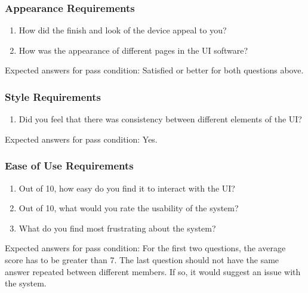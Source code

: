 \documentclass[12pt, titlepage]{article}
\begin{document}
\subsubsection{Appearance Requirements}

\begin{enumerate}
\item{How did the finish and look of the device appeal to you?\\}
\item{How was the appearance of different pages in the UI software?\\}

\end{enumerate}

\noindent Expected answers for pass condition: Satisfied or better for both questions above.


\subsubsection{Style Requirements}

\begin{enumerate}
\item{Did you feel that there was consistency between different elements of the UI?\\}

\end{enumerate}

\noindent Expected answers for pass condition: Yes.


\subsubsection{Ease of Use Requirements}

\begin{enumerate}
\item{Out of 10, how easy do you find it to interact with the UI?\\}
\item{Out of 10, what would you rate the usability of the system?\\}
\item{What do you find most frustrating about the system?\\}

\end{enumerate}

\noindent Expected answers for pass condition: For the first two questions, the average score has to be greater than 7. The last question should not have the same answer repeated between different members. If so, it would suggest an issue with the system. 
\end{document}
